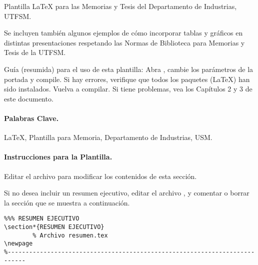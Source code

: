 
Plantilla \LaTeX{} para las Memorias y Tesis del Departamento de Industrias, UTFSM.

Se incluyen también algunos ejemplos de cómo incorporar tablas y gráficos en distintas presentaciones respetando las Normas de Biblioteca para Memorias y Tesis de la UTFSM.

Guía (resumida) para el uso de esta plantilla: Abra , cambie los parámetros de la portada y compile. Si hay errores, verifique que todos los paquetes (\LaTeX{}) han sido instalados. Vuelva a compilar. Si tiene problemas, vea los Capítulos 2 y 3 de este documento.

\vspace{30mm}

\paragraph{Palabras Clave.}
\LaTeX{}, Plantilla para Memoria, Departamento de Industrias, USM.

\vspace{20mm}


\paragraph{Instrucciones para la Plantilla.}

Editar el archivo  para modificar los contenidos de esta sección.

Si no desea incluir un resumen ejecutivo, editar el archivo , y comentar o borrar la sección que se muestra a continuación.

\begin{Verbatim}[frame=lines, label=\inlinecode{/latex/memoria.tex} (extracto)
				, fontsize=\footnotesize
				, baselinestretch=1
				, formatcom=\color{gray}]
%---------------------------------------------------------------------------
%%% RESUMEN EJECUTIVO
\section*{RESUMEN EJECUTIVO}
		% Archivo resumen.tex
\newpage
%---------------------------------------------------------------------------
\end{Verbatim}
